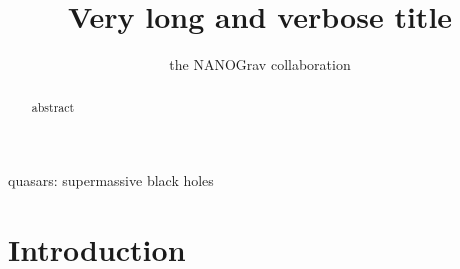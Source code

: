 %
%
%







\def\oldbibitem{} \let\oldbibitem=\bibitem
\def\bibitem{\stepcounter{citnum}\oldbibitem}

\newcommand{\orcidauthorA}{0000-0002-6625-6450} %

\title[Short Title]{Very long and verbose title}
\author[NANOGrav]{the NANOGrav collaboration}




\maketitle

\begin{abstract}
    abstract
\end{abstract}

\begin{keywords}
    quasars: supermassive black holes
\end{keywords}



\section{Introduction}
    \label{sec:intro}



